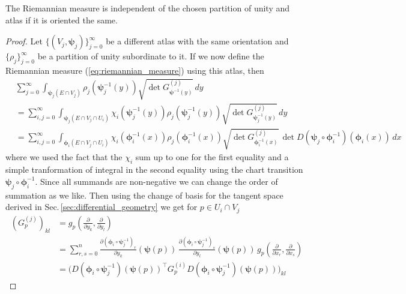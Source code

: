 \documentclass[../master_thesis.tex]{subfiles}
\begin{document}
\begin{proposition}
    The Riemannian measure is independent of the chosen partition of unity and atlas if it is 
    oriented the same.
\end{proposition}
\begin{proof}
    Let $\{(V_j, \boldsymbol{\psi}_j)\}_{j=0}^\infty$ 
    be a different atlas with the same orientation and 
    $\{\rho_j\}_{j=0}^\infty$ be a partition of unity subordinate to it. If we now 
    define the Riemannian measure (\ref{eq:riemannian_measure}) using this atlas, then
    \begin{align}
        &\sum_{j=0}^\infty \int_{\boldsymbol{\psi}_j(E\cap V_j)} \rho_j(\boldsymbol{\psi}_j^{-1}(y))
            \sqrt{\det G^{(j)}_{\boldsymbol{\psi}^{-1}(y)}} \, dy \nonumber
        \\ &= \sum_{i,j=0}^\infty \int_{\boldsymbol{\psi}_j(E\cap V_j \cap U_i)} \chi_i(\boldsymbol{\psi}_j^{-1}(y)) \rho_j(\boldsymbol{\psi}_j^{-1}(y))
            \sqrt{\det G^{(j)}_{\boldsymbol{\psi}_j^{-1}(y)}} \, dy \nonumber
        \\ &= \sum_{i,j=0}^\infty \int_{\boldsymbol{\phi}_i(E\cap V_j \cap U_i)} \chi_i(\boldsymbol{\phi}_i^{-1}(x)) \rho_j(\boldsymbol{\phi}_i^{-1}(x))
            \sqrt{\det G^{(j)}_{\boldsymbol{\phi}_i^{-1}(x)}} \, \det D(\boldsymbol{\psi}_j \circ \boldsymbol{\phi}^{-1}_i)(\boldsymbol{\phi}_i(x)) \, dx \label{eq:double_sum_riemannian_measure}
    \end{align}
    where we used the fact that the $\chi_i$ sum up to one for the first 
    equality and a simple tranformation of integral in the second equality
    using the chart transition $\boldsymbol{\psi}_j\circ \boldsymbol{\phi}_i^{-1}$. Since all summands 
    are non-negative we can change the order of summation as we like. Then using the 
    change of basis for the tangent space derived in Sec.\,\ref{sec:differential_geometry}
    we get for $p \in U_i \cap V_j$
    \begin{align*}
        (G^{(j)}_p)_{kl} &= g_p(\frac{\partial}{\partial y_k}, \frac{\partial}{\partial y_l})
        \\ &= \sum_{r,s=0}^n \frac{\partial(\boldsymbol{\phi}_i \circ \boldsymbol{\psi}_j^{-1})_r}{\partial y_k}(\boldsymbol{\psi}(p))
            \, \frac{\partial(\boldsymbol{\phi}_i \circ \boldsymbol{\psi}_j^{-1})_s}{\partial y_l}(\boldsymbol{\psi}(p))
            \, g_p(\frac{\partial}{\partial x_r}, \frac{\partial}{\partial x_s})
        \\ &= \bigg( D(\boldsymbol{\phi}_i \circ \boldsymbol{\psi}_j^{-1})(\boldsymbol{\psi}(p))^\top G^{(i)}_p D(\boldsymbol{\phi}_i \circ \boldsymbol{\psi}_j^{-1})(\boldsymbol{\psi}(p))\bigg)_{kl}

\end{align*}
\end{proof}
\end{document}
